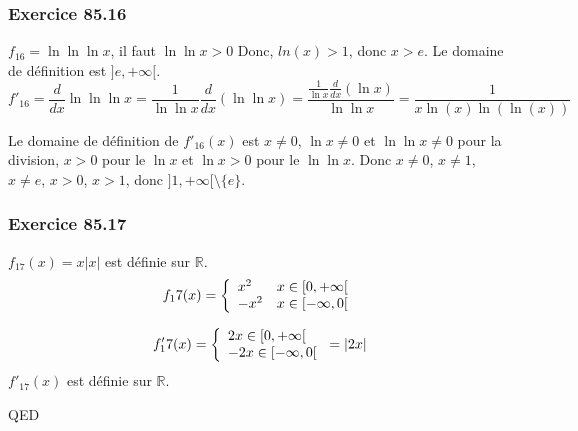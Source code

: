 \documentclass[]{book}
\theoremstyle{definition}
\newcommand{\bb}[1]{\mathbb{#1}}
\newcommand{\R}{\bb{R}}
\begin{document}
\subsubsection*{Exercice 85.16}
$f_{16} = \ln\ln\ln x$, il faut $\ln\ln x > 0$ Donc,  $ln(x) > 1$, donc $x>e$. Le domaine de d\'efinition est $]e,+\infty[$.\\

$$f'_{16} = \frac{d}{dx}\ln\ln\ln x = \frac{1}{\ln \ln x} \frac{d}{dx}(\ln\ln x) = \frac{\frac{1}{\ln x}\frac{d}{dx}(\ln x)}{\ln \ln x} = \frac{1}{x\ln(x)\ln(\ln(x))} $$

Le domaine de d\'efinition de $f'_{16}(x)$ est $x \neq 0$, $\ln x \neq 0$ et $\ln \ln x \neq 0$ pour la division, $x>0$ pour le $\ln x$ et $\ln x>0$ pour le $\ln \ln x$. Donc $x \neq 0$, $x \neq 1$, $x \neq e$, $x>0$, $x>1$, donc $]1,+\infty[\setminus \{e\}$.


\subsubsection*{Exercice 85.17}
$f_{17}(x) = x|x|$ est d\'efinie sur $\R$.
$$
f_17(x) = 
\left\{ 
\begin{array}{l l}
x^2 & x \in [0,+\infty[ \\
-x^2 & x \in [-\infty,0[ \\
\end{array}
\right. 
$$

$$
f'_17(x) = 
\left\{ 
\begin{array}{l l}
2x \in [0,+\infty[ \\
-2x \in [-\infty,0[ \\
\end{array}
\right. 
=
|2x|
$$
$f'_{17}(x)$ est d\'efinie sur $\R$.



QED
\end{document}
